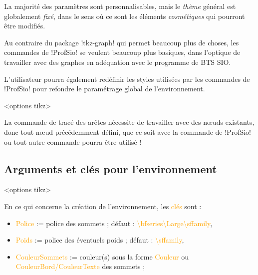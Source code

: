 \documentclass[french,a4paper,11pt]{article}
\newcommand\Cle[1]{{\small\sffamily\textlangle \textcolor{orange}{#1}\textrangle}}
\begin{document}
{{\begin{warningblock}
La majorité des paramètres sont personnalisables, mais le \textit{thème} général est globalement \textit{fixé}, dans le sens où ce sont les éléments \textit{cosmétiques} qui pourront être modifiés.

\smallskip

Au contraire du package \packagetex!tkz-graph! qui permet beaucoup plus de choses, les commandes de \packagetex!ProfSio! se veulent beaucoup plus basiques, dans l'optique de travailler avec des graphes en adéquation avec le programme de BTS SIO.
\end{warningblock}

\begin{noteblock}
L'utilisateur pourra également redéfinir les styles utilisées par les commandes de \packagetex!ProfSio! pour refondre le paramétrage global de l'environnement.
\end{noteblock}

\begin{DemoCode}
\begin{GrapheTikz}[clés]<options tikz>
\end{GrapheTikz}
\end{DemoCode}

\begin{tipblock}
La commande de tracé des arêtes nécessite de travailler avec des nœuds existants, donc tout nœud précédemment défini, que ce soit avec la commande de \packagetex!ProfSio! ou tout autre commande pourra être utilisé !
\end{tipblock}

\subsection{Arguments et clés pour l'environnement}

\begin{DemoCode}
\begin{GrapheTikz}[clés]<options tikz>
\end{GrapheTikz}
\end{DemoCode}

\begin{tipblock}
En ce qui concerne la création de l'environnement, les \Cle{clés} sont :

\begin{itemize}
	\item \Cle{Police} := police des sommets ; \hfill{}défaut : \Cle{\textbackslash bfseries\textbackslash Large\textbackslash sffamily},%
	\item \Cle{Poids} := police des éventuels poids ; \hfill{}défaut : \Cle{\textbackslash sffamily},%
	\item \Cle{CouleurSommets} := couleur(s) sous la forme \Cle{Couleur} ou \Cle{CouleurBord/CouleurTexte} des sommets ;
	

\end{itemize}
\end{tipblock}}}
\end{document}
